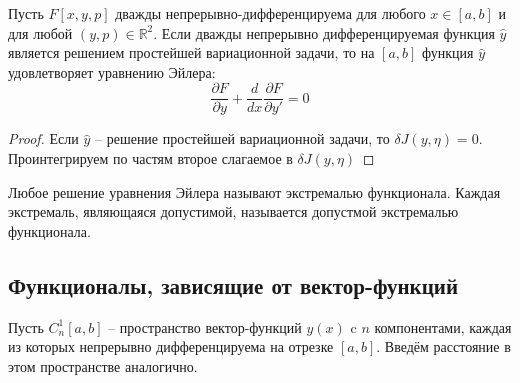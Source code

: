 \documentclass[document.tex]{subfiles}
\begin{document}
\begin{theorem}
    Пусть $F[x, y, p]$ дважды непрерывно-дифференцируема для любого $x \in [a, b]$ и для любой $(y, p) \in
    \mathbb{R}^2$. Если дважды непрерывно дифференцируемая функция $\hat y$ является решением простейшей вариационной
    задачи, то на $[a, b]$ функция $\hat y$ удовлетворяет уравнению Эйлера:
    \[
        \frac{\partial F}{\partial y} + \frac{d}{dx} \frac{\partial F}{\partial y'} = 0
    \]
\end{theorem}

\begin{proof}
    Если $\hat y$ -- решение простейшей вариационной задачи, то $\delta J(y, \eta) = 0$. Проинтегрируем по частям второе
    слагаемое в $\delta J(y, \eta)$
\end{proof}

\begin{definition}
    Любое решение уравнения Эйлера называют экстремалью функционала. Каждая экстремаль, являющаяся допустимой,
    называется допустмой экстремалью функционала. 
\end{definition}

\subsection{Функционалы, зависящие от вектор-функций}
Пусть $C_n^1[a, b]$ -- пространство вектор-функций $y(x)$ c $n$ компонентами, каждая из которых непрерывно
дифференцируема на отрезке $[a, b]$. Введём расстояние в этом пространстве аналогично.
\end{document}
